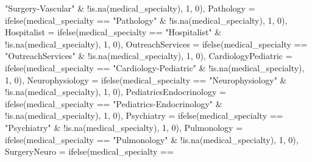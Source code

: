 \documentclass[
]{article}
\newenvironment{Shaded}{\begin{snugshade}}{\end{snugshade}}
\newcommand{\AttributeTok}[1]{\textcolor[rgb]{0.77,0.63,0.00}{#1}}
\newcommand{\DecValTok}[1]{\textcolor[rgb]{0.00,0.00,0.81}{#1}}
\newcommand{\FunctionTok}[1]{\textcolor[rgb]{0.00,0.00,0.00}{#1}}
\newcommand{\NormalTok}[1]{#1}
\newcommand{\SpecialCharTok}[1]{\textcolor[rgb]{0.00,0.00,0.00}{#1}}
\newcommand{\StringTok}[1]{\textcolor[rgb]{0.31,0.60,0.02}{#1}}
\begin{document}
\begin{Shaded}
\begin{Highlighting}[]
            \StringTok{"Surgery{-}Vascular"} \SpecialCharTok{\&} \SpecialCharTok{!}\FunctionTok{is.na}\NormalTok{(medical\_specialty),}
            \DecValTok{1}\NormalTok{, }\DecValTok{0}\NormalTok{), }\AttributeTok{Pathology =} \FunctionTok{ifelse}\NormalTok{(medical\_specialty }\SpecialCharTok{==}
            \StringTok{"Pathology"} \SpecialCharTok{\&} \SpecialCharTok{!}\FunctionTok{is.na}\NormalTok{(medical\_specialty),}
            \DecValTok{1}\NormalTok{, }\DecValTok{0}\NormalTok{), }\AttributeTok{Hospitalist =} \FunctionTok{ifelse}\NormalTok{(medical\_specialty }\SpecialCharTok{==}
            \StringTok{"Hospitalist"} \SpecialCharTok{\&} \SpecialCharTok{!}\FunctionTok{is.na}\NormalTok{(medical\_specialty),}
            \DecValTok{1}\NormalTok{, }\DecValTok{0}\NormalTok{), }\AttributeTok{OutreachServices =} \FunctionTok{ifelse}\NormalTok{(medical\_specialty }\SpecialCharTok{==}
            \StringTok{"OutreachServices"} \SpecialCharTok{\&} \SpecialCharTok{!}\FunctionTok{is.na}\NormalTok{(medical\_specialty),}
            \DecValTok{1}\NormalTok{, }\DecValTok{0}\NormalTok{), }\AttributeTok{CardiologyPediatric =} \FunctionTok{ifelse}\NormalTok{(medical\_specialty }\SpecialCharTok{==}
            \StringTok{"Cardiology{-}Pediatric"} \SpecialCharTok{\&} \SpecialCharTok{!}\FunctionTok{is.na}\NormalTok{(medical\_specialty),}
            \DecValTok{1}\NormalTok{, }\DecValTok{0}\NormalTok{), }\AttributeTok{Neurophysiology =} \FunctionTok{ifelse}\NormalTok{(medical\_specialty }\SpecialCharTok{==}
            \StringTok{"Neurophysiology"} \SpecialCharTok{\&} \SpecialCharTok{!}\FunctionTok{is.na}\NormalTok{(medical\_specialty),}
            \DecValTok{1}\NormalTok{, }\DecValTok{0}\NormalTok{), }\AttributeTok{PediatricsEndocrinology =} \FunctionTok{ifelse}\NormalTok{(medical\_specialty }\SpecialCharTok{==}
            \StringTok{"Pediatrics{-}Endocrinology"} \SpecialCharTok{\&} \SpecialCharTok{!}\FunctionTok{is.na}\NormalTok{(medical\_specialty),}
            \DecValTok{1}\NormalTok{, }\DecValTok{0}\NormalTok{), }\AttributeTok{Psychiatry =} \FunctionTok{ifelse}\NormalTok{(medical\_specialty }\SpecialCharTok{==}
            \StringTok{"Psychiatry"} \SpecialCharTok{\&} \SpecialCharTok{!}\FunctionTok{is.na}\NormalTok{(medical\_specialty),}
            \DecValTok{1}\NormalTok{, }\DecValTok{0}\NormalTok{), }\AttributeTok{Pulmonology =} \FunctionTok{ifelse}\NormalTok{(medical\_specialty }\SpecialCharTok{==}
            \StringTok{"Pulmonology"} \SpecialCharTok{\&} \SpecialCharTok{!}\FunctionTok{is.na}\NormalTok{(medical\_specialty),}
            \DecValTok{1}\NormalTok{, }\DecValTok{0}\NormalTok{), }\AttributeTok{SurgeryNeuro =} \FunctionTok{ifelse}\NormalTok{(medical\_specialty }\SpecialCharTok{==}

\end{Highlighting}
\end{Shaded}
\end{document}
